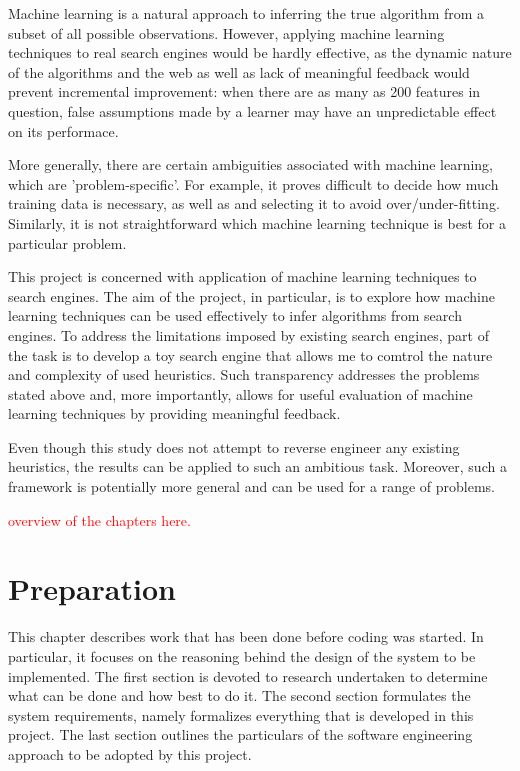 \documentclass[12pt,twoside,notitlepage]{report}
\begin{document}
Machine learning is a natural approach to inferring the true algorithm from a
subset of all possible observations. However, applying machine learning
techniques to real search engines would be hardly effective, as the dynamic
nature of the algorithms and the web as well as lack of meaningful feedback
would prevent incremental improvement: when there are as many as 200 features
in question, false assumptions made by a learner may have an unpredictable
effect on its performace.

More generally, there are certain ambiguities associated with machine learning,
which are 'problem-specific'. For example, it proves difficult to decide how
much training data is necessary, as well as and selecting it to avoid
over/under-fitting\cite{domingos}. Similarly, it is not straightforward which
machine learning technique is best for a particular problem.

This project is concerned with application of machine learning techniques to
search engines. The aim of the project, in particular,  is to explore how
machine learning techniques can be used effectively to infer algorithms from
search engines. To address the limitations imposed by existing search engines,
part of the task is to develop a toy search engine that allows me to comtrol
the nature and complexity of used heuristics. Such transparency addresses the
problems stated above and, more importantly,  allows for useful evaluation of
machine learning techniques by providing meaningful feedback.

Even though this study does not attempt to reverse engineer any existing
heuristics, the results can be applied to such an ambitious task.
Moreover, such a framework is potentially more general and can be used for a
range of problems.

\newcommand\todo[1]{\textcolor{red}{#1}}
\todo{overview of the chapters here.}

\cleardoublepage
\chapter{Preparation}

This chapter describes work that has been done before coding was started.  In
particular, it focuses on the reasoning behind the design of the system to be
implemented. The first section is devoted to research undertaken to determine
what can be done and how best to do it. The second section formulates the
system requirements, namely formalizes everything that is developed in this
project. The last section outlines the particulars of the software engineering
approach to be adopted by this project.
\end{document}
